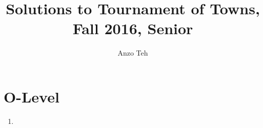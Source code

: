 \documentclass[11pt,a4paper]{article}
\begin{document}
\newcommand{\la}{\leftarrow}
\newcommand{\lra}{\leftrightarrow}
\newcommand{\bbN}{\mathbb{N}}
\newcommand{\bbZ}{\mathbb{Z}}
\newcommand{\dsum}{\displaystyle\sum}
\newcommand{\dprod}{\displaystyle\prod}


\title{Solutions to Tournament of Towns, Fall 2016, Senior}
\author{Anzo Teh}
\date{}
\maketitle

\section*{O-Level}
\begin{enumerate}
	\item
\end{enumerate}
\end{document}
